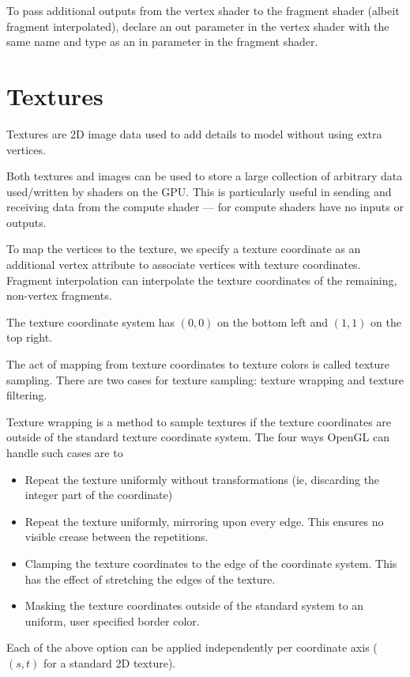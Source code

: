 \documentclass[11pt]{article}
\numberwithin{equation}{section}
\begin{document}
To pass additional outputs from the vertex shader to the fragment shader (albeit fragment interpolated), declare an out parameter in the vertex shader with the same name and type as an in parameter in the fragment shader.

\section{Textures}
Textures are 2D image data used to add details to model without using extra vertices.

Both textures and images can be used to store a large collection of arbitrary data used/written by shaders on the GPU. This is particularly useful in sending and receiving data from the compute shader --- for compute shaders have no inputs or outputs.

To map the vertices to the texture, we specify a texture coordinate as an additional vertex attribute to associate vertices with texture coordinates. Fragment interpolation can interpolate the texture coordinates of the remaining, non-vertex fragments.

The texture coordinate system has $(0, 0)$ on the bottom left and $(1, 1)$ on the top right.

The act of mapping from texture coordinates to texture colors is called texture sampling. There are two cases for texture sampling: texture wrapping and texture filtering.

Texture wrapping is a method to sample textures if the texture coordinates are outside of the standard texture coordinate system. The four ways OpenGL can handle such cases are to
\begin{itemize}
	\item Repeat the texture uniformly without transformations (ie, discarding the integer part of the coordinate)
	\item Repeat the texture uniformly, mirroring upon every edge. This ensures no visible crease between the repetitions.
	\item Clamping the texture coordinates to the edge of the coordinate system. This has the effect of stretching the edges of the texture.
	\item Masking the texture coordinates outside of the standard system to an uniform, user specified border color.
\end{itemize}
Each of the above option can be applied independently per coordinate axis ($(s, t)$ for a standard 2D texture).
\end{document}
